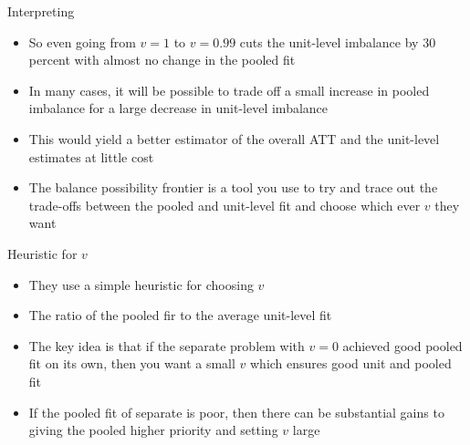 \documentclass{beamer}
\begin{document}







\begin{frame}{Interpreting}

\begin{itemize}

\item So even going from $v=1$ to $v=0.99$ cuts the unit-level imbalance by 30 percent with almost no change in the pooled fit
\item In many cases, it will be possible to trade off a small increase in pooled imbalance for a large decrease in unit-level imbalance
\item This would yield a better estimator of the overall ATT and the unit-level estimates at little cost
\item The balance possibility frontier is a tool you use to try and trace out the trade-offs between the pooled and unit-level fit and choose which ever $v$ they want

\end{itemize}

\end{frame}

\begin{frame}{Heuristic for $v$}

\begin{itemize}

\item They use a simple heuristic for choosing $v$
\item The ratio of the pooled fir to the average unit-level fit
\item The key idea is that if the separate problem with $v=0$ achieved good pooled fit on its own, then you want a small $v$ which ensures good unit and pooled fit
\item If the pooled fit of separate is poor, then there can be substantial gains to giving the pooled higher priority and setting $v$ large

\end{itemize}

\end{frame}
\end{document}
